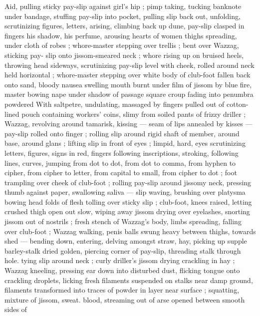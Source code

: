 Aid\textregistered, pulling sticky pay-slip against girl's hip ; pimp taking, tucking 
banknote under bandage, stuffing pay-slip into pocket, pulling slip 
back out, unfolding, scrutinizing figures, letters, arising, climbing 
back up dune, pay-slip clasped in fingers {\col} his shadow, his perfume, 
arousing hearts of women {\col} thighs spreading, under cloth of robes ; 
whore-master stepping over trellis ; bent over Wazzag, sticking pay- 
slip onto jissom-smeared neck ; whore rising up on bruised heels, 
throwing head sideways, scrutinizing pay-slip level with cheek, rolled 
around neck held horizontal ; whore-master stepping over white body 
of club-foot fallen back onto sand, bloody nausea swelling mouth 
burnt under film of jissom by blue fire, master bowing nape under 
shadow of passage {\col} square croup fading into penumbra powdered 
With saltpetre, undulating, massaged by fingers pulled out of cotton- 
lined pouch containing workers' coins, slimy from soiled pants of 
frizzy driller ; Wazzag, revolving around tamarisk, kissing --- seam of 
lips annealed by kisses --- pay-slip rolled onto finger ; rolling slip 
around rigid shaft of member, around base, around glans ; lifting slip 
in front of eyes ; limpid, hard, eyes scrutinizing letters, figures, signs 
in red, fingers following inscriptions, stroking, following lines, 
curves, jumping from dot to dot, from dot to comma, from hyphen to 
cipher, from cipher to letter, from capital to small, from cipher to dot 
; foot trampling over cheek of club-foot ; rolling pay-slip around 
jissomy neck, pressing thumb against paper, swallowing saliva --- 
slip waving, brushing over platysma {\dashcom} bowing head {\col} folds of flesh 
tolling over sticky slip ; club-foot, knees raised, letting crushed thigh 
open out slow, wiping away jissom drying over eyelashes, snorting 
jissom out of nostrils ; fresh stench of Wazzag's body, limbs 
spreading, falling over club-foot ; Wazzag walking, penis balls swung 
heavy between thighs, towards shed --- bending down, entering, 
delving amongst straw, hay, picking up supple barley-stalk dried 
golden, piercing corner of pay-slip, threading stalk through hole. 
tying slip around neck ; curly driller's jissom drying crackling in hay 
; Wazzag kneeling, pressing ear down into disturbed dust, flicking 
tongue onto crackling droplets, licking fresh filaments suspended on 
stalks near damp ground, filaments transformed into traces of 
powder in layer near surface ; squatting, mixture of jissom, sweat. 
blood, streaming out of arse opened between smooth sides of 
